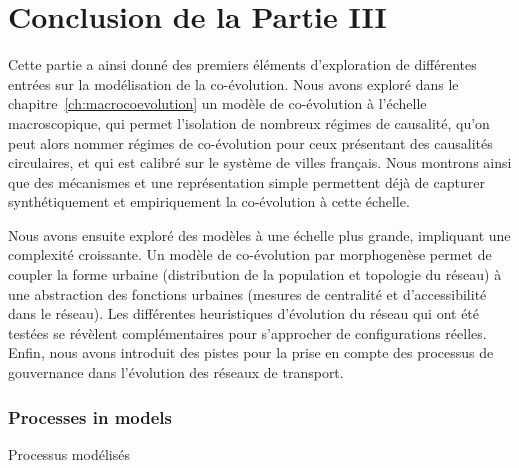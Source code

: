 





\chapter*{Conclusion de la Partie III}






Cette partie a ainsi donné des premiers éléments d'exploration de différentes entrées sur la modélisation de la co-évolution. Nous avons exploré dans le chapitre~\ref{ch:macrocoevolution} un modèle de co-évolution à l'échelle macroscopique, qui permet l'isolation de nombreux régimes de causalité, qu'on peut alors nommer régimes de co-évolution pour ceux présentant des causalités circulaires, et qui est calibré sur le système de villes français. Nous montrons ainsi que des mécanismes et une représentation simple permettent déjà de capturer synthétiquement et empiriquement la co-évolution à cette échelle.

Nous avons ensuite exploré des modèles à une échelle plus grande, impliquant une complexité croissante. Un modèle de co-évolution par morphogenèse permet de coupler la forme urbaine (distribution de la population et topologie du réseau) à une abstraction des fonctions urbaines (mesures de centralité et d'accessibilité dans le réseau). Les différentes heuristiques d'évolution du réseau qui ont été testées se révèlent complémentaires pour s'approcher de configurations réelles. Enfin, nous avons introduit des pistes pour la prise en compte des processus de gouvernance dans l'évolution des réseaux de transport.




\subsection*{Processes in models}{Processus modélisés}


